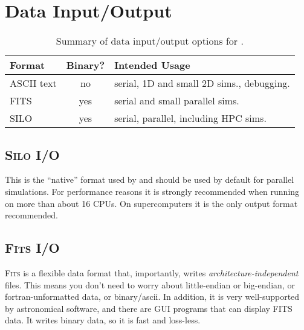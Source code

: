 \documentclass[a4paper,11pt]{report}
\begin{document}
\chapter{Data Input/Output}

\begin{table}
  \centering
  \caption{
    Summary of data input/output options for \pion{}.
  }
  \begin{tabular}{ l c l}
    Format & Binary? & Intended Usage \\
    \hline
    ASCII text & no   & serial, 1D and small 2D sims., debugging. \\
    FITS       & yes  & serial and small parallel sims. \\
    SILO       & yes  & serial, parallel, including HPC sims. \\
  \end{tabular}
  \label{tab:ioformats}
\end{table}


\section{\textsc{Silo} I/O}
This is the ``native'' format used by \pion{} and should be used by default for parallel simulations.
For performance reasons it is strongly recommended when running on more than about 16 CPUs.
On supercomputers it is the only output format recommended.


\section{\textsc{Fits} I/O}
\textsc{Fits} is a flexible data format that, importantly, writes \emph{architecture-independent} files.
This means you don't need to worry about little-endian or big-endian, or fortran-unformatted data, or binary/ascii.
In addition, it is very well-supported by astronomical software, and there are GUI programs that can display FITS data.
It writes binary data, so it is fast and loss-less.
\end{document}
